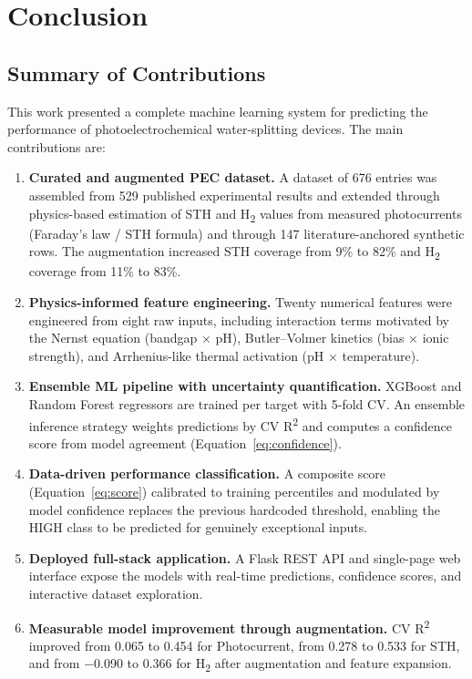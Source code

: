 \chapter{Conclusion}\label{ch:concl}

\section{Summary of Contributions}

This work presented a complete machine learning system for predicting the
performance of photoelectrochemical water-splitting devices.
The main contributions are:

\begin{enumerate}
  \item \textbf{Curated and augmented PEC dataset.}
        A dataset of 676 entries was assembled from 529 published experimental
        results and extended through physics-based estimation of STH and
        H\textsubscript{2} values from measured photocurrents (Faraday's law /
        STH formula) and through 147 literature-anchored synthetic rows.
        The augmentation increased STH coverage from 9\% to 82\% and
        H\textsubscript{2} coverage from 11\% to 83\%.

  \item \textbf{Physics-informed feature engineering.}
        Twenty numerical features were engineered from eight raw inputs,
        including interaction terms motivated by the Nernst equation
        (bandgap $\times$ pH), Butler--Volmer kinetics (bias $\times$ ionic strength),
        and Arrhenius-like thermal activation (pH $\times$ temperature).

  \item \textbf{Ensemble ML pipeline with uncertainty quantification.}
        XGBoost and Random Forest regressors are trained per target with
        5-fold CV.
        An ensemble inference strategy weights predictions by CV R\textsuperscript{2}
        and computes a confidence score from model agreement (Equation~\ref{eq:confidence}).

  \item \textbf{Data-driven performance classification.}
        A composite score (Equation~\ref{eq:score}) calibrated to training
        percentiles and modulated by model confidence replaces the previous
        hardcoded threshold, enabling the HIGH class to be predicted for
        genuinely exceptional inputs.

  \item \textbf{Deployed full-stack application.}
        A Flask REST API and single-page web interface expose the models
        with real-time predictions, confidence scores, and interactive
        dataset exploration.

  \item \textbf{Measurable model improvement through augmentation.}
        CV R\textsuperscript{2} improved from 0.065 to 0.454 for Photocurrent,
        from 0.278 to 0.533 for STH, and from $-$0.090 to 0.366 for
        H\textsubscript{2} after augmentation and feature expansion.
\end{enumerate}

